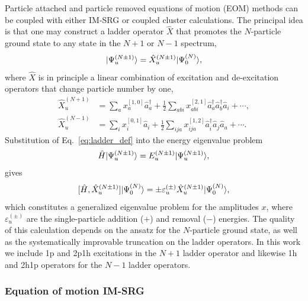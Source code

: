 Particle attached and particle removed equations of motion (EOM) methods can be coupled with either IM-SRG or coupled cluster calculations. The principal idea is that one may construct a ladder operator $\hat{X}$ that promotes the $N$-particle ground state to any state in the $N + 1$ or $N - 1$ spectrum,
\begin{equation}\label{eq:ladder_def}
  | \Psi^{(N \pm 1)}_u \rangle  = \hat{X}^{(N \pm 1)}_u | \Psi^{(N)}_0 \rangle,
\end{equation}
where $\hat{X}$ is in principle a linear combination of excitation and de-excitation operators that change particle number by one,
\begin{align}
  \label{eq:gen_attached}
  \hat{X}^{(N + 1)}_u &= \sum_a x^{[1, 0]}_a  \hat{a}^\dagger_a + \frac{1}{2} \sum_{a b i} x^{[2, 1]}_{a b i} \hat{a}^\dagger_a \hat{a}^\dagger_b \hat{a}_i^{} + \cdots,  \\
  \label{eq:gen_removed}
  \hat{X}^{(N - 1)}_u &= \sum_i x_i^{[0, 1]} \hat{a}_i^{} + \frac{1}{2} \sum_{i j a} x^{[1, 2]}_{i j a} \hat{a}^\dagger_i \hat{a}_j^{} \hat{a}_a^{}  + \cdots.
\end{align}
Substitution of Eq.\ \eqref{eq:ladder_def} into the energy eigenvalue problem
\begin{gather*}
  \hat H | \Psi_u^{(N \pm 1)} \rangle = E^{(N\pm1)}_u | \Psi_u^{(N \pm 1)} \rangle,
\end{gather*}
gives
\begin{equation}\label{eq:EOM}
  [\hat{H}, \hat{X}^{(N \pm 1)}_u] | \Psi^{(N)}_0 \rangle = \pm \varepsilon^{(\pm)}_u \hat{X}^{(N \pm 1)}_u | \Psi^{(N)}_0 \rangle,
\end{equation}
which constitutes a generalized eigenvalue problem for the amplitudes $x$, where $\varepsilon^{(\pm)}_u$ are the single-particle addition ($+$) and removal ($-$) energies. The quality of this calculation depends on the ansatz for the $N$-particle ground state, as well as the systematically improvable truncation on the ladder operators. In this work we include 1p and 2p1h excitations in the $N + 1$ ladder operator and likewise 1h and 2h1p operators for the $N - 1$ ladder operators.

\subsubsection*{Equation of motion IM-SRG}

